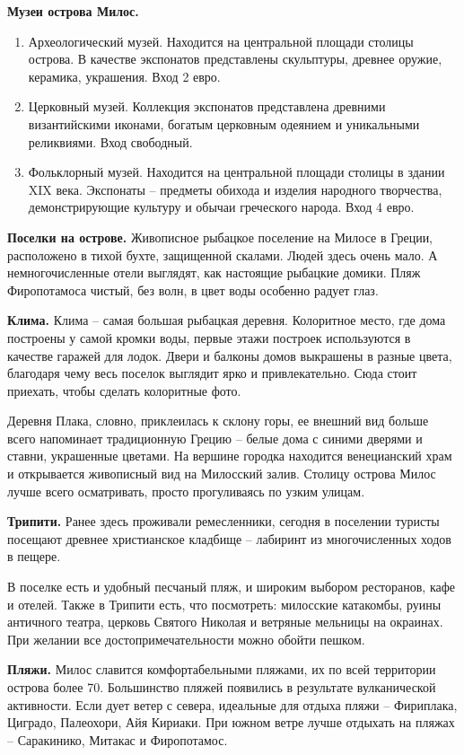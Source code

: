 \textbf{Музеи острова Милос.}
\begin{enumerate}
    \item Археологический музей. Находится на центральной площади столицы острова. В качестве экспонатов представлены скульптуры, древнее оружие, керамика, украшения. Вход 2 евро.
    \item Церковный музей. Коллекция экспонатов представлена древними византийскими иконами, богатым церковным одеянием и уникальными реликвиями. Вход свободный.
    \item Фольклорный музей. Находится на центральной площади столицы в здании XIX века. Экспонаты – предметы обихода и изделия народного творчества, демонстрирующие культуру и обычаи греческого народа. Вход 4 евро.
\end{enumerate}

\textbf{Поселки на острове.}
Живописное рыбацкое поселение на Милосе в Греции, расположено в тихой бухте, защищенной скалами. Людей здесь очень мало. А немногочисленные отели выглядят, как настоящие рыбацкие домики. Пляж Фиропотамоса чистый, без волн, в цвет воды особенно радует глаз.

\textbf{Клима.} Клима – самая большая рыбацкая деревня. Колоритное место, где дома построены у самой кромки воды, первые этажи построек используются в качестве гаражей для лодок. Двери и балконы домов выкрашены в разные цвета, благодаря чему весь поселок выглядит ярко и привлекательно. Сюда стоит приехать, чтобы сделать колоритные фото.

Деревня Плака, словно, приклеилась к склону горы, ее внешний вид больше всего напоминает традиционную Грецию – белые дома с синими дверями и ставни, украшенные цветами. На вершине городка находится венецианский храм и открывается живописный вид на Милосский залив. Столицу острова Милос лучше всего осматривать, просто прогуливаясь по узким улицам.

\textbf{Трипити.}
Ранее здесь проживали ремесленники, сегодня в поселении туристы посещают древнее христианское кладбище – лабиринт из многочисленных ходов в пещере.

В поселке есть и удобный песчаный пляж, и широким выбором ресторанов, кафе и отелей. Также в Трипити есть, что посмотреть: милосские катакомбы, руины античного театра, церковь Святого Николая и ветряные мельницы на окраинах. При желании все достопримечательности можно обойти пешком.

\textbf{Пляжи.}
Милос славится комфортабельными пляжами, их по всей территории острова более 70. Большинство пляжей появились в результате вулканической активности. Если дует ветер с севера, идеальные для отдыха пляжи – Фириплака, Циградо, Палеохори, Айя Кириаки. При южном ветре лучше отдыхать на пляжах – Саракинико, Митакас и Фиропотамос.


